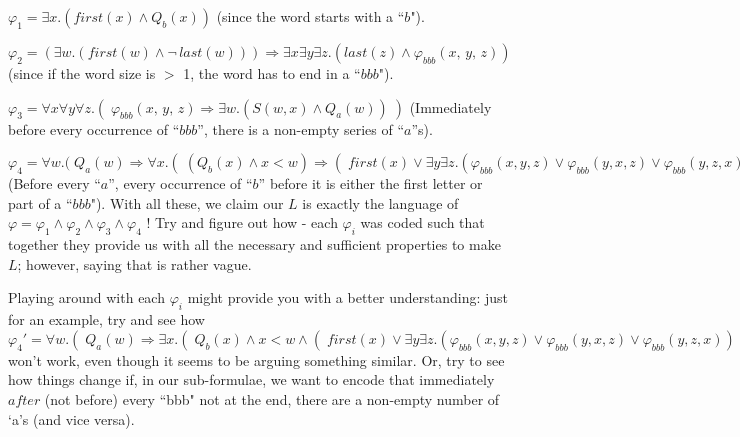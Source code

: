 \documentclass{article}
\begin{document}
\begin{flushleft}
$\varphi_1 = \exists x.(first(x) \land Q_b(x))$ (since the word starts with a ``$b$").

$\varphi_2 = (\exists w.(first(w) \land \neg\, last(w))) \Rightarrow \exists x \exists y \exists z.(last(z) \land \varphi_{bbb}(x,\, y,\, z))$ (since if the word size is $>$ 1, the word has to end in a ``$bbb$").

$\varphi_3 = \forall x \forall y \forall z.(\;\varphi_{bbb}(x,\, y,\, z) \Rightarrow \exists w.(S(w, x) \land Q_a(w))\;)$ (Immediately before every occurrence of ``$bbb$'', there is a non-empty series of ``$a$''s).

$\varphi_4 = \forall w.(\; Q_a(w) \Rightarrow \forall x.(\;(Q_b(x) \land x < w) \Rightarrow (\; first(x) \lor \exists y \exists z.(\varphi_{bbb}(x, y, z) \lor \varphi_{bbb}(y, x, z) \lor \varphi_{bbb}(y, z, x)\;) \;)\;)$ (Before every ``$a$'', every occurrence of ``$b$'' before it is either the first letter or part of a ``$bbb$").
With all these, we claim our $L$ is exactly the language of $\varphi = \varphi_1 \land \varphi_2 \land \varphi_3 \land \varphi_4$ ! Try and figure out how - each $\varphi_i$ was coded such that together they provide us with all the necessary and sufficient properties to make $L$; however, saying that is rather vague.

Playing around with each $\varphi_i$ might provide you with a better understanding: just for an example, try and see how $\varphi_4' = \forall w.(\; Q_a(w) \Rightarrow \exists x.(\;Q_b(x) \land x < w \land (\; first(x) \lor \exists y \exists z.(\varphi_{bbb}(x, y, z) \lor \varphi_{bbb}(y, x, z) \lor \varphi_{bbb}(y, z, x))\;) \;)\;)$ won't work, even though it seems to be arguing something similar. Or, try to see how things change if, in our sub-formulae, we want to encode that immediately $after$ (not before) every ``bbb" not at the end, there are a non-empty number of `a's (and vice versa).
\end{flushleft}
\end{document}
